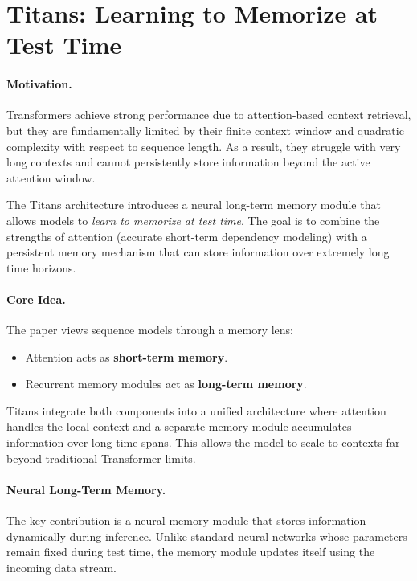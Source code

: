 \documentclass[12pt]{article}
\begin{document}
\psetheader %

\section*{Titans: Learning to Memorize at Test Time}

\paragraph{Motivation.}
Transformers achieve strong performance due to attention-based context retrieval, but they are fundamentally limited by
their finite context window and quadratic complexity with respect to sequence length. As a result, they struggle with
very long contexts and cannot persistently store information beyond the active attention window.

The Titans architecture introduces a neural long-term memory module that allows models to \emph{learn to memorize at
test time}. The goal is to combine the strengths of attention (accurate short-term dependency modeling) with
a persistent
memory mechanism that can store information over extremely long time horizons.

\paragraph{Core Idea.}
The paper views sequence models through a memory lens:

\begin{itemize}
		\item Attention acts as \textbf{short-term memory}.
		\item Recurrent memory modules act as \textbf{long-term memory}.
\end{itemize}

Titans integrate both components into a unified architecture where attention handles the local context and a separate
memory module accumulates information over long time spans. This allows the model to scale to contexts far beyond
traditional Transformer limits. \cite{titans}

\paragraph{Neural Long-Term Memory.}
The key contribution is a neural memory module that stores information dynamically during inference.
Unlike standard neural networks whose parameters remain fixed during test time, the memory module
updates itself using the incoming data stream.
\end{document}
